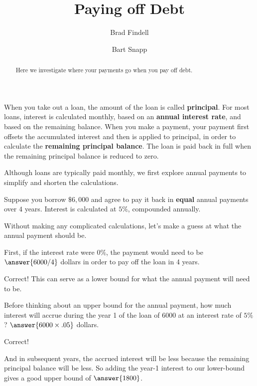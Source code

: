 \documentclass[handout,space,nooutcomes]{ximera}
\title{Paying off Debt}
\author{Brad Findell \and Bart Snapp}
\begin{document}
\begin{abstract}
Here we investigate where your payments go when you pay off debt.
\end{abstract}
\maketitle

When you take out a loan, the amount of the loan is called
\textbf{principal}.  For most loans, interest is calculated monthly,
based on an \textbf{annual interest rate}, and based on the remaining
balance.  When you make a payment, your payment first offsets the
accumulated interest and then is applied to principal, in order to
calculate the \textbf{remaining principal balance}.  The loan is paid
back in full when the remaining principal balance is reduced to zero.


Although loans are typically paid monthly, we first explore annual payments to simplify and shorten the calculations.  

\begin{question}
Suppose you borrow $\$6,000$ and agree to pay it back in \textbf{equal} annual
payments over $4$ years.  Interest is calculated at $5\%$,
compounded annually. 

Without making any complicated calculations, let's make a guess at what the annual payment should be.  

First, if the interest rate were $0\%$, the payment would need to be $\answer{6000/4}$ dollars in order to pay off the loan in 4 years.  

\begin{question}
Correct!  This can serve as a lower bound for what the annual payment will need to be.  

Before thinking about an upper bound for the annual payment, how much interest will accrue during the year 1 of the loan of $6000$ 
at an interest rate of $5\%$?  
$\answer{6000\times.05}$ dollars.  

\begin{question}
Correct!  

And in subsequent years, the accrued interest will be less because the remaining principal balance will be less.  
So adding the year-1 interest to our lower-bound gives a good upper bound of $\answer{1800}$.  
 
\end{question}
\end{question}
\end{question}
\end{document}
